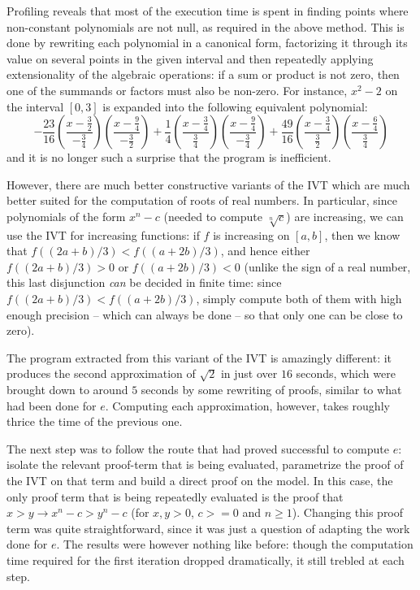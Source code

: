 \documentclass{entcs}
\begin{document}
Profiling reveals that most of the execution time is spent
in finding points where non-constant polynomials are not null, 
as required in the above method.
This is done by rewriting each polynomial in
a canonical form, factorizing it through its value on several points in the
given interval and then repeatedly applying extensionality of the algebraic
operations: if a sum or product is not zero, then one
of the summands or factors must also be non-zero.  For instance,
$x^2-2$ on the interval $[0,3]$ is expanded into the following equivalent polynomial: 
\[\textstyle
-\frac{23}{16}\left(\frac{x-\frac32}{-\frac34}\right)\left(\frac{x-\frac94}{-\frac32}\right)+%
\frac14\left(\frac{x-\frac34}{\frac34}\right)\left(\frac{x-\frac94}{-\frac34}\right)+%
\frac{49}{16}\left(\frac{x-\frac34}{\frac32}\right)\left(\frac{x-\frac64}{\frac34}\right)\]
and it is no longer such a surprise that the program is inefficient.

However, there are much better constructive variants of the IVT which
are much better suited for the computation of roots of real numbers.
In particular, since polynomials of the
form $x^n-c$ (needed to compute $\sqrt[n]c$) are increasing, we can use
the IVT for
increasing functions: if $f$ is increasing on $[a,b]$, then we know
that $f((2a+b)/3)<f((a+2b)/3)$, and hence either $f((2a+b)/3)>0$ or
$f((a+2b)/3)<0$
(unlike the sign of a real number, this last disjunction \emph{can} be decided
in finite time: since $f((2a+b)/3)<f((a+2b)/3)$, simply compute both of them
with high enough precision -- which can always be done -- so that only one
can be close to zero).

The program extracted from this variant of the IVT is
amazingly different: it produces the
second approximation of $\sqrt2$ in just over $16$ seconds,
which were brought down to around $5$ seconds by some rewriting of
proofs, similar to what had been done for $e$.  Computing each
approximation, however, takes roughly thrice the time of the previous one.


The next step was to follow the route that had proved successful
to compute $e$: isolate the relevant proof-term that is being
evaluated, parametrize the proof of the IVT on that term and build a
direct proof on the model.  In this case, the
only proof term that is being repeatedly evaluated is the proof that
$x>y \to x^n-c > y^n-c$ (for $x,y>0$, $c>=0$ and $n\geq 1$).
Changing this proof term was quite straightforward, since it was just
a question of adapting the work done for $e$.
The results were however nothing like before: though the computation time
required for the first iteration dropped dramatically, it
still trebled at each step.
\end{document}
